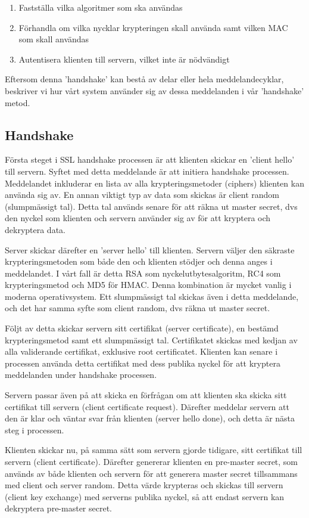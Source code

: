 \begin{enumerate}
\item{Fastställa vilka algoritmer som ska användas}
\item{Förhandla om vilka nycklar krypteringen skall använda samt vilken MAC som skall användas}
\item{Autentisera klienten till servern, vilket inte är nödvändigt}
\end{enumerate}

Eftersom denna 'handshake' kan bestå av delar eller hela meddelandecyklar, beskriver vi hur vårt system använder sig av dessa meddelanden i vår 'handshake' metod.

\subsection{Handshake}
Första steget i SSL handshake processen är att klienten skickar en 'client hello' till servern. Syftet med detta meddelande är att initiera handshake processen. Meddelandet inkluderar en lista av alla krypteringsmetoder (ciphers) klienten kan använda sig av. En annan viktigt typ av data som skickas är client random (slumpmässigt tal). Detta tal används senare för att räkna ut master secret, dvs den nyckel som klienten och servern använder sig av för att kryptera och dekryptera data.

Server skickar därefter en 'server hello' till klienten. Servern väljer den säkraste krypteringsmetoden som både den och klienten stödjer och denna anges i meddelandet. I vårt fall är detta RSA som nyckelutbytesalgoritm, RC4 som krypteringsmetod och MD5 för HMAC. Denna kombination är mycket vanlig i moderna operativsystem. Ett slumpmässigt tal skickas även i detta meddelande, och det har samma syfte som client random, dvs räkna ut master secret.

Följt av detta skickar servern sitt certifikat (server certificate), en bestämd krypteringsmetod samt ett slumpmässigt tal. Certifikatet skickas med kedjan av alla validerande certifikat, exklusive root certificatet. Klienten kan senare i processen använda detta certifikat med dess publika nyckel för att kryptera meddelanden under handshake processen.

Servern passar även på att skicka en förfrågan om att klienten ska skicka sitt certifikat till servern (client certificate request). Därefter meddelar servern att den är klar och väntar svar från klienten (server hello done), och detta är nästa steg i processen.

Klienten skickar nu, på samma sätt som servern gjorde tidigare, sitt certifikat till servern (client certificate). Därefter genererar klienten en pre-master secret, som används av både klienten och servern för att generera master secret tillsammans med client och server random. Detta värde krypteras och skickas till servern (client key exchange) med serverns publika nyckel, så att endast servern kan dekryptera pre-master secret.

